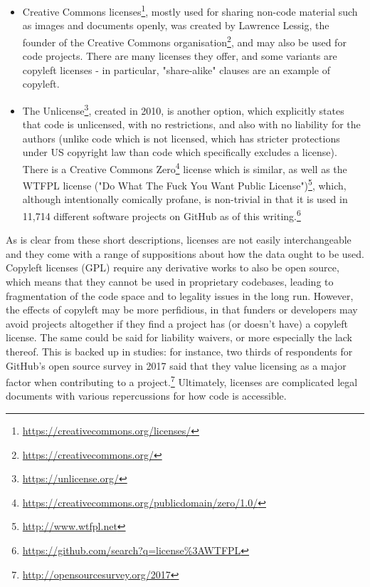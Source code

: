 \begin{itemize}
\item Creative Commons licenses\footnote{\href{https://creativecommons.org/licenses/}{https://creativecommons.org/licenses/}}, mostly used for sharing non-code material such as images and documents openly, was created by Lawrence Lessig, the founder of the Creative Commons organisation\footnote{\href{https://creativecommons.org/}{https://creativecommons.org/}}, and may also be used for code projects. There are many licenses they offer, and some variants are copyleft licenses - in particular, "share-alike" clauses are an example of copyleft.
\item The Unlicense\footnote{\href{https://unlicense.org/}{https://unlicense.org/}}, created in 2010, is another option, which explicitly states that code is unlicensed, with no restrictions, and also with no liability for the authors (unlike code which is not licensed, which has stricter protections under US copyright law than code which specifically excludes a license). There is a Creative Commons Zero\footnote{\href{https://creativecommons.org/publicdomain/zero/1.0/}{https://creativecommons.org/publicdomain/zero/1.0/}} license which is similar, as well as the WTFPL license ("Do What The Fuck You Want Public License")\footnote{\href{http://www.wtfpl.net}{http://www.wtfpl.net}}, which, although intentionally comically profane, is non-trivial in that it is used in 11,714 different software projects on GitHub as of this writing.\footnote{\href{https://github.com/search?q=license\%3AWTFPL}{https://github.com/search?q=license\%3AWTFPL}}
\end{itemize}

As is clear from these short descriptions, licenses are not easily interchangeable and they come with a range of suppositions about how the data ought to be used. Copyleft licenses (GPL) require any derivative works to also be open source, which means that they cannot be used in proprietary codebases, leading to fragmentation of the code space and to legality issues in the long run. However, the effects of copyleft may be more perfidious, in that funders or developers may avoid projects altogether if they find a project has (or doesn't have) a copyleft license. The same could be said for liability waivers, or more especially the lack thereof. This is backed up in studies: for instance, two thirds of respondents for GitHub's open source survey in 2017 said that they value licensing as a major factor when contributing to a project.\footnote{\href{http://opensourcesurvey.org/2017}{http://opensourcesurvey.org/2017}} Ultimately, licenses are complicated legal documents with various repercussions for how code is accessible.

